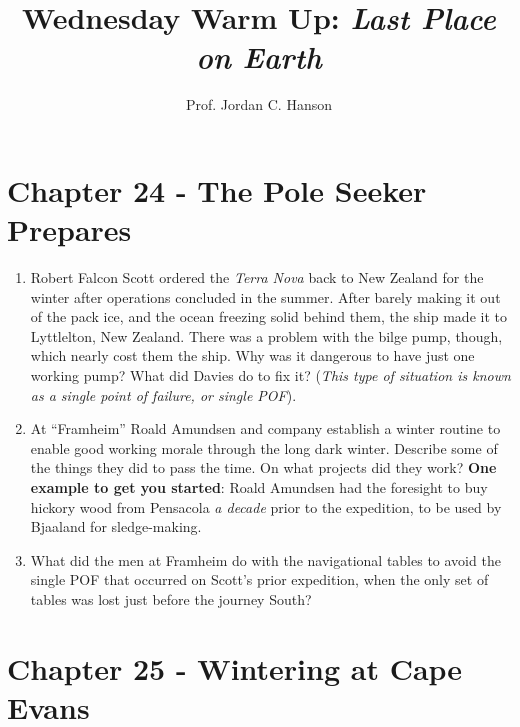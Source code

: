 \documentclass{article}
\begin{document}
\small
\twocolumn

\title{Wednesday Warm Up: \textit{Last Place on Earth}}
\author{Prof. Jordan C. Hanson}

\maketitle

\section{Chapter 24 - The Pole Seeker \\ Prepares}

\begin{enumerate}
\item Robert Falcon Scott ordered the \textit{Terra Nova} back to New Zealand for the winter after operations concluded in the summer.  After barely making it out of the pack ice, and the ocean freezing solid behind them, the ship made it to Lyttlelton, New Zealand.  There was a problem with the bilge pump, though, which nearly cost them the ship.  Why was it dangerous to have just one working pump?  What did Davies do to fix it?  (\textit{This type of situation is known as a single point of failure, or single POF}). \\ \vspace{2cm}
\item At ``Framheim'' Roald Amundsen and company establish a winter routine to enable good working morale through the long dark winter.  Describe some of the things they did to pass the time.  On what projects did they work?  \textbf{One example to get you started}: Roald Amundsen had the foresight to buy hickory wood from Pensacola \textit{a decade} prior to the expedition, to be used by Bjaaland for sledge-making.\\ \vspace{2cm}
\item What did the men at Framheim do with the navigational tables to avoid the single POF that occurred on Scott's prior expedition, when the only set of tables was lost just before the journey South? \\ \vspace{2cm}
\end{enumerate}

\section{Chapter 25 - Wintering at Cape Evans}
\end{document}
